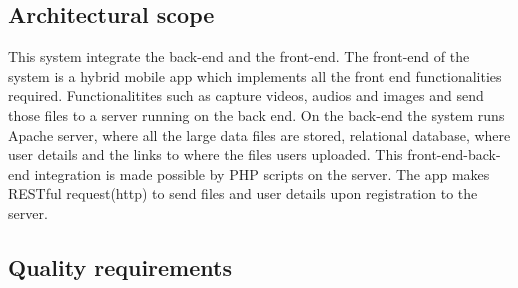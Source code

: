\documentclass[a4paper,12pt]{article}
\begin{document}
\subsection{Architectural scope}
This system integrate the back-end and the front-end. The front-end of the system is a hybrid mobile app which implements all the front end functionalities required. Functionalitites such as capture videos, audios and images and send those files to a server running on the back end. On the back-end the system runs Apache server, where all the large data files are stored, relational database, where user details and the links to where the files users uploaded. This front-end-back-end integration is made possible by PHP scripts on the server. The app makes RESTful request(http) to send files and user details upon registration to the server.  
\subsection{Quality requirements}
\end{document}
